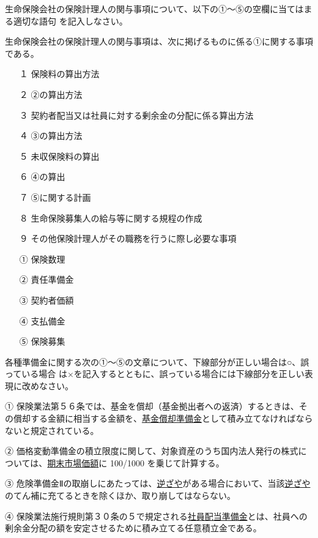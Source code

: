 \documentclass[report,gutter=10mm,fore-edge=10mm,uplatex,dvipdfmx]{jlreq}
\begin{document}

生命保険会社の保険計理人の関与事項について、以下の①～⑤の空欄に当てはまる適切な語句
を記入しなさい。

生命保険会社の保険計理人の関与事項は、次に掲げるものに係る①に関する事項である。

\begin{itemize}
\item[ １]  保険料の算出方法
\item[ ２]  ②の算出方法
\item[ ３]  契約者配当又は社員に対する剰余金の分配に係る算出方法
\item[ ４]  ③の算出方法
\item[ ５]  未収保険料の算出
\item[ ６]  ④の算出
\item[ ７]  ⑤に関する計画
\item[ ８]  生命保険募集人の給与等に関する規程の作成
\item[ ９]  その他保険計理人がその職務を行うに際し必要な事項
\end{itemize}
\answer{}
\begin{itemize}
\item[ ① ] 保険数理
\item[ ② ] 責任準備金
\item[ ③ ] 契約者価額
\item[ ④ ] 支払備金
\item[ ⑤ ] 保険募集
\end{itemize}


各種準備金に関する次の①～⑤の文章について、下線部分が正しい場合は○、誤っている場合
は×を記入するとともに、誤っている場合には下線部分を正しい表現に改めなさい。

① 保険業法第５６条では、基金を償却（基金拠出者への返済）するときは、その償却する金額に相当する金額を、\underline{基金償却準備金}として積み立てなければならないと規定されている。

② 価格変動準備金の積立限度に関して、対象資産のうち国内法人発行の株式については、\underline{期末市場価額}に 100/1000 を乗じて計算する。

③ 危険準備金Ⅱの取崩しにあたっては、\underline{逆ざや}がある場合において、当該\underline{逆ざや}のてん補に充てるときを除くほか、取り崩してはならない。

④ 保険業法施行規則第３０条の５で規定される\underline{社員配当準備金}とは、社員への剰余金分配の額を安定させるために積み立てる任意積立金である。
\end{document}

